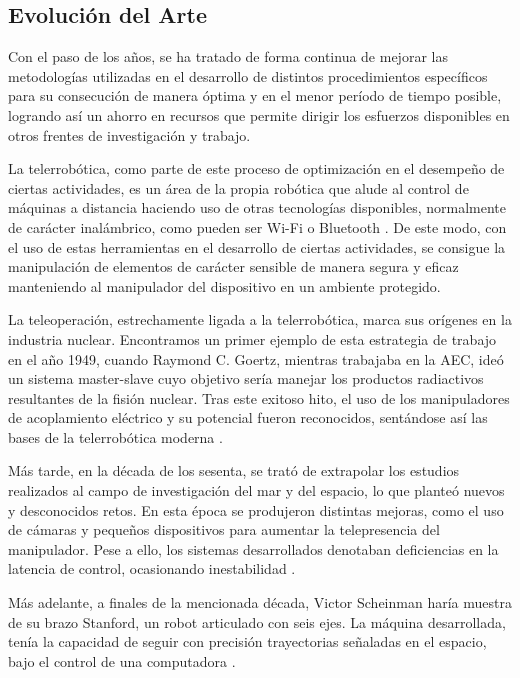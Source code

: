 \subsection{Evolución del Arte}

Con el paso de los años, se ha tratado de forma continua de mejorar las metodologías utilizadas en el desarrollo de distintos procedimientos específicos para su consecución de manera óptima y en el menor período de tiempo posible, logrando así un ahorro en recursos que permite dirigir los esfuerzos disponibles en otros frentes de investigación y trabajo.

La telerrobótica, como parte de este proceso de optimización en el desempeño de ciertas actividades, es un área de la propia robótica que alude al control de máquinas a distancia haciendo uso de otras tecnologías disponibles, normalmente de carácter inalámbrico, como pueden ser Wi-Fi o Bluetooth \cite{3}. De este modo, con el uso de estas herramientas en el desarrollo de ciertas actividades, se consigue la manipulación de elementos de carácter sensible de manera segura y eficaz manteniendo al manipulador del dispositivo en un ambiente protegido.

La teleoperación, estrechamente ligada a la telerrobótica, marca sus orígenes en la industria nuclear. Encontramos un primer ejemplo de esta estrategia de trabajo en el año 1949, cuando Raymond C. Goertz, mientras trabajaba en la AEC, ideó un sistema master-slave cuyo objetivo sería manejar los productos radiactivos resultantes de la fisión nuclear. Tras este exitoso hito, el uso de los manipuladores de acoplamiento eléctrico y su potencial fueron reconocidos, sentándose así las bases de la telerrobótica moderna \cite{4}.

Más tarde, en la década de los sesenta, se trató de extrapolar los estudios realizados al campo de investigación del mar y del espacio, lo que planteó nuevos y desconocidos retos. En esta época se produjeron distintas mejoras, como el uso de cámaras y pequeños dispositivos para aumentar la telepresencia del manipulador. Pese a ello, los sistemas desarrollados denotaban deficiencias en la latencia de control, ocasionando inestabilidad \cite{5}.

Más adelante, a finales de la mencionada década, Victor Scheinman haría muestra de su brazo Stanford, un robot articulado con seis ejes. La máquina desarrollada, tenía la capacidad de seguir con precisión trayectorias señaladas en el espacio, bajo el control de una computadora \cite{6}. 

